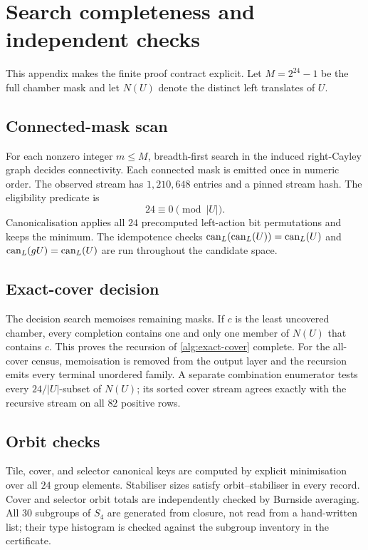\section{Search completeness and independent checks}
\label{app:search}

This appendix makes the finite proof contract explicit.  Let $M=2^{24}-1$
be the full chamber mask and let $N(U)$ denote the distinct left translates
of $U$.

\subsection{Connected-mask scan}

For each nonzero integer $m\le M$, breadth-first search in the induced
right-Cayley graph decides connectivity.  Each connected mask is emitted
once in numeric order.  The observed stream has $1{,}210{,}648$ entries and a
pinned stream hash.  The eligibility predicate is
\[
 24\equiv0\pmod{|U|}.
\]
Canonicalisation applies all $24$ precomputed left-action bit permutations
and keeps the minimum.  The idempotence checks
$\operatorname{can}_L(\operatorname{can}_L(U))=\operatorname{can}_L(U)$ and
$\operatorname{can}_L(gU)=\operatorname{can}_L(U)$ are run throughout the candidate space.

\subsection{Exact-cover decision}

The decision search memoises remaining masks.  If $c$ is the least uncovered
chamber, every completion contains one and only one member of $N(U)$ that
contains $c$.  This proves the recursion of \cref{alg:exact-cover} complete.
For the all-cover census, memoisation is removed from the output layer and
the recursion emits every terminal unordered family.  A separate
combination enumerator tests every $24/|U|$-subset of $N(U)$; its sorted cover
stream agrees exactly with the recursive stream on all $82$ positive rows.

\subsection{Orbit checks}

Tile, cover, and selector canonical keys are computed by explicit minimisation
over all $24$ group elements.  Stabiliser sizes satisfy orbit--stabiliser in
every record.  Cover and selector orbit totals are independently checked by
Burnside averaging.  All $30$ subgroups of $S_4$ are generated from closure,
not read from a hand-written list; their type histogram is checked against
the subgroup inventory in the certificate.

